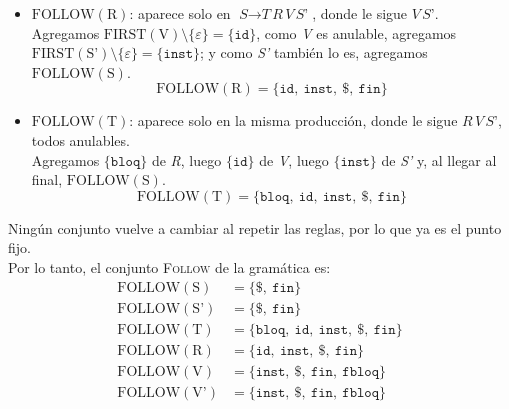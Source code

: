 \documentclass[12pt,letterpaper]{article}
\newcommand{\nt}[1]{\textit{#1}}
\newcommand{\tk}[1]{\texttt{#1}}
\newcommand{\tx}[1]{\text{#1}}
\newcommand{\First}[1]{\mathrm{FIRST}(#1)}
\newcommand{\Follow}[1]{\mathrm{FOLLOW}(#1)}
\newcommand{\eps}{\varepsilon}
\begin{document}
\begin{enumerate}[label=\arabic*.]
\begin{itemize}
\begin{itemize}
    \item $\Follow{\tx{R}}$: aparece solo en $\nt{S}\to\nt{T}\,\nt{R}\,\nt{V}\,\nt{S'}$, donde le sigue
      $\nt{V}\,\nt{S'}$.\\
      Agregamos $\First{\tx{V}}\setminus\{\eps\}=\{\tk{id}\}$, como \nt{V} es anulable, agregamos
      $\First{\tx{S'}}\setminus\{\eps\}=\{\tk{inst}\}$; y como \nt{S'} también lo es, agregamos
      $\Follow{\tx{S}}$.
      \[
      \Follow{\tx{R}} = \{\tk{id},\ \tk{inst},\ \tk{\$},\ \tk{fin}\}
      \]

    \item $\Follow{\tx{T}}$: aparece solo en la misma producción, donde le sigue $\nt{R}\,\nt{V}\,\nt{S'}$,
      todos anulables.\\
      Agregamos $\{\tk{bloq}\}$ de \nt{R}, luego $\{\tk{id}\}$ de \nt{V}, luego $\{\tk{inst}\}$ de \nt{S'} y,
      al llegar al final, $\Follow{\tx{S}}$.
      \[
      \Follow{\tx{T}} = \{\tk{bloq},\ \tk{id},\ \tk{inst},\ \tk{\$},\ \tk{fin}\}
      \]
    \end{itemize}
    Ningún conjunto vuelve a cambiar al repetir las reglas, por lo que ya es el punto fijo.\\

    Por lo tanto, el conjunto \textsc{Follow} de la gramática es:
    \[
    \begin{aligned}
      \Follow{\tx{S}}  &= \{\tk{\$},\ \tk{fin}\} \\
      \Follow{\tx{S'}} &= \{\tk{\$},\ \tk{fin}\} \\
      \Follow{\tx{T}}  &= \{\tk{bloq},\ \tk{id},\ \tk{inst},\ \tk{\$},\ \tk{fin}\} \\
      \Follow{\tx{R}}  &= \{\tk{id},\ \tk{inst},\ \tk{\$},\ \tk{fin}\} \\
      \Follow{\tx{V}}  &= \{\tk{inst},\ \tk{\$},\ \tk{fin},\ \tk{fbloq}\} \\
      \Follow{\tx{V'}} &= \{\tk{inst},\ \tk{\$},\ \tk{fin},\ \tk{fbloq}\}
    \end{aligned}
    \]

    \bigskip


\end{itemize}
\end{enumerate}
\end{document}
